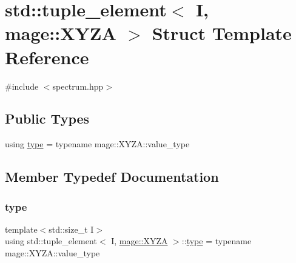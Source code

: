 \hypertarget{structstd_1_1tuple__element_3_01_i_00_01mage_1_1_x_y_z_a_01_4}{}\section{std\+:\+:tuple\+\_\+element$<$ I, mage\+:\+:X\+Y\+ZA $>$ Struct Template Reference}
\label{structstd_1_1tuple__element_3_01_i_00_01mage_1_1_x_y_z_a_01_4}


{\ttfamily \#include $<$spectrum.\+hpp$>$}

\subsection*{Public Types}
\begin{DoxyCompactItemize}
\item 
using \mbox{\hyperlink{structstd_1_1tuple__element_3_01_i_00_01mage_1_1_x_y_z_a_01_4_a92a24d062c477271f5b58fc5d8487b1c}{type}} = typename mage\+::\+X\+Y\+Z\+A\+::value\+\_\+type
\end{DoxyCompactItemize}


\subsection{Member Typedef Documentation}
\mbox{\label{structstd_1_1tuple__element_3_01_i_00_01mage_1_1_x_y_z_a_01_4_a92a24d062c477271f5b58fc5d8487b1c}} 
\subsubsection{\texorpdfstring{type}{type}}
{\footnotesize\ttfamily template$<$std\+::size\+\_\+t I$>$ \\
using std\+::tuple\+\_\+element$<$ I, \mbox{\hyperlink{structmage_1_1_x_y_z_a}{mage\+::\+X\+Y\+ZA}} $>$\+::\mbox{\hyperlink{structstd_1_1tuple__element_3_01_i_00_01mage_1_1_x_y_z_a_01_4_a92a24d062c477271f5b58fc5d8487b1c}{type}} =  typename mage\+::\+X\+Y\+Z\+A\+::value\+\_\+type}

